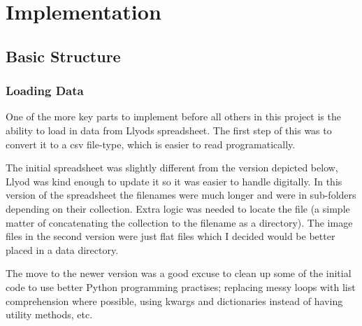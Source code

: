 \chapter{Implementation}



\section{Basic Structure}

\subsection{Loading Data}
One of the more key parts to implement before all others in this project is the ability to load in
data from Llyods spreadsheet. The first step of this was to convert it to a \gls{csv} file-type,
which is easier to read programatically.

The initial spreadsheet was slightly different from the version depicted below, Llyod was kind 
enough to update it so it was easier to handle digitally. In this version of the spreadsheet the
filenames were much longer and were in sub-folders depending on their collection. Extra logic was
needed to locate the file (a simple matter of concatenating the collection to the filename as a
directory). The image files in the second version were just flat files which I decided would be
better placed in a data directory.

The move to the newer version was a good excuse to clean up some of the initial code to use better
Python programming practises; replacing messy loops with list comprehension where possible, using
\gls{kwargs} and dictionaries instead of having utility methods, etc.


